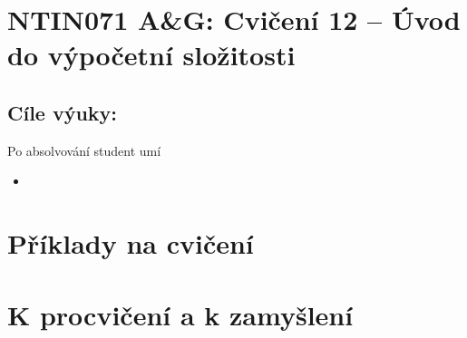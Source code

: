 \documentclass[a4paper,12pt]{amsart}
\begin{document}
\thispagestyle{empty}

\section*{NTIN071 A\&G: Cvičení 12 -- Úvod do výpočetní složitosti}

\medskip

\subsection*{Cíle výuky:} Po absolvování student umí

\begin{itemize}\setlength{\itemsep}{0pt}
    
    \item 
\end{itemize}

\section*{Příklady na cvičení}

\medskip\begin{problem} 

\end{problem}


\section*{K procvičení a k zamyšlení}


\medskip\begin{problem}

\end{problem}
\end{document}
